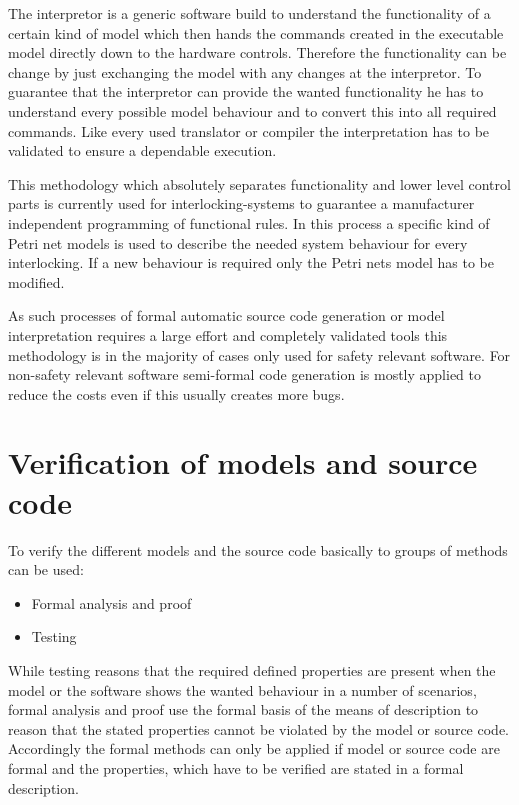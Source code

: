 \documentclass{./template/openetcs_report}
\begin{document}
The interpretor is a generic software build to understand the functionality of a certain kind of model which then hands the commands created in the executable model directly down to the hardware controls. Therefore the functionality can be change by just exchanging the model with any changes at the interpretor. To guarantee that the interpretor can provide the wanted functionality he has to understand every possible model behaviour and to convert this into all required commands. Like every used translator or compiler the interpretation has to be validated to ensure a dependable execution.

This methodology which absolutely separates functionality and lower level control parts is currently used for interlocking-systems to guarantee a manufacturer independent programming of functional rules. In this process a specific kind of Petri net models is used to describe the needed system behaviour for every interlocking. If a new behaviour is required only the Petri nets model has to be modified.

As such processes of formal automatic source code generation or model interpretation requires a large effort and completely validated tools this methodology is in the majority of cases only used for safety relevant software.  For non-safety relevant software semi-formal code generation is mostly applied to reduce the costs even if this usually creates more bugs. 

\section{Verification of models and source code}

To verify the different models and the source code basically to groups of methods can be used:
\vspace{-10pt}
\begin{itemize}[topsep=2pt, partopsep=2pt,itemsep=2pt,parsep=2pt]
\item Formal analysis and proof
\item Testing
\end{itemize}

While testing reasons that the required defined properties are present when the model or the software  shows the wanted behaviour in a number of scenarios, formal analysis and proof use the formal basis of the means of description to reason that the stated properties cannot be violated by the model or source code. Accordingly the formal methods can only be applied if  model or source code are formal and the properties, which have to be verified are stated in a formal description. 
\end{document}
